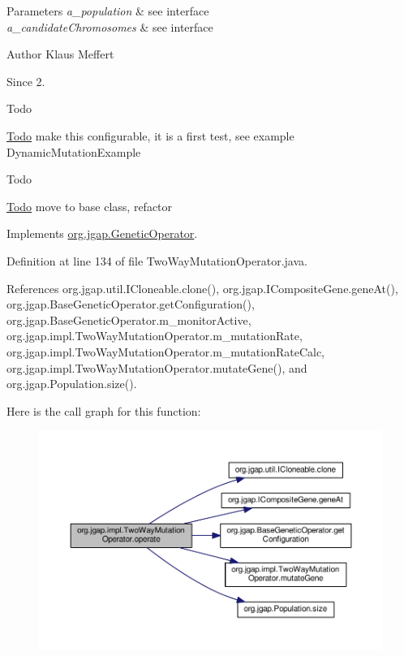 \begin{DoxyParams}{Parameters}
{\em a\-\_\-population} & see interface \\
\hline
{\em a\-\_\-candidate\-Chromosomes} & see interface\\
\hline
\end{DoxyParams}
\begin{DoxyAuthor}{Author}
Klaus Meffert 
\end{DoxyAuthor}
\begin{DoxySince}{Since}
2. 
\end{DoxySince}
\begin{DoxyRefDesc}{Todo}
\item[\hyperlink{todo__todo000175}{Todo}]make this configurable, it is a first test, see example Dynamic\-Mutation\-Example \end{DoxyRefDesc}


\begin{DoxyRefDesc}{Todo}
\item[\hyperlink{todo__todo000176}{Todo}]move to base class, refactor \end{DoxyRefDesc}


Implements \hyperlink{interfaceorg_1_1jgap_1_1_genetic_operator_a0f9dfe925c4c21e07522be67d6c5d084}{org.\-jgap.\-Genetic\-Operator}.



Definition at line 134 of file Two\-Way\-Mutation\-Operator.\-java.



References org.\-jgap.\-util.\-I\-Cloneable.\-clone(), org.\-jgap.\-I\-Composite\-Gene.\-gene\-At(), org.\-jgap.\-Base\-Genetic\-Operator.\-get\-Configuration(), org.\-jgap.\-Base\-Genetic\-Operator.\-m\-\_\-monitor\-Active, org.\-jgap.\-impl.\-Two\-Way\-Mutation\-Operator.\-m\-\_\-mutation\-Rate, org.\-jgap.\-impl.\-Two\-Way\-Mutation\-Operator.\-m\-\_\-mutation\-Rate\-Calc, org.\-jgap.\-impl.\-Two\-Way\-Mutation\-Operator.\-mutate\-Gene(), and org.\-jgap.\-Population.\-size().



Here is the call graph for this function\-:
\nopagebreak
\begin{figure}[H]
\begin{center}
\leavevmode
\includegraphics[width=350pt]{classorg_1_1jgap_1_1impl_1_1_two_way_mutation_operator_a53ac73cd4e6b197e6756d4efe02bd01e_cgraph}
\end{center}
\end{figure}


